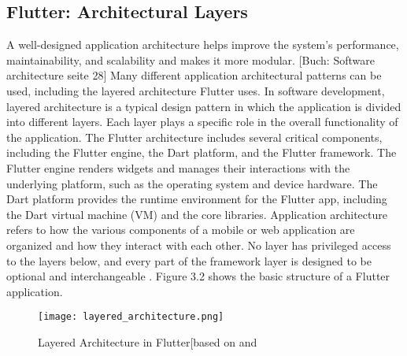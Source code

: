 \subsection{Flutter: Architectural Layers}
A well-designed application architecture helps improve the system's performance, maintainability, and scalability and makes it more modular. [Buch: Software architecture seite 28] Many different application architectural patterns can be used, including the layered architecture Flutter uses. In software development, layered architecture is a typical design pattern in which the application is divided into different layers. Each layer plays a specific role in the overall functionality of the application. The Flutter architecture includes several critical components, including the Flutter engine, the Dart platform, and the Flutter framework. The Flutter engine renders widgets and manages their interactions with the underlying platform, such as the operating system and device hardware. The Dart platform provides the runtime environment for the Flutter app, including the Dart virtual machine (VM) and the core libraries. Application architecture refers to how the various components of a mobile or web application are organized and how they interact with each other. No layer has privileged access to the layers below, and every part of the framework layer is designed to be optional and interchangeable \cite{.flutterarchitecture}. Figure 3.2 shows the basic structure of a Flutter application. 
\begin{figure}[H]
	\centering
	\texttt{[image: layered\_architecture.png]}
	\caption[Layered Architecture in Flutter]{Layered Architecture in Flutter[based on \cite{.flutterarchitecture} and \cite[p. 50]{.flutterinaction}}
\end{figure}

